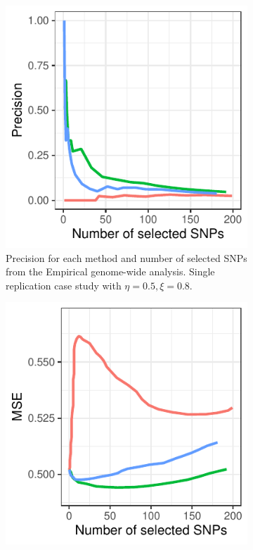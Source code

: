 \begin{figure}[H]
     \centering
     \begin{subfigure}[b]{0.4\textwidth}
         \centering
         \includegraphics[width=\textwidth]{figures/figure_05a.pdf}
         \caption{Precision for each method and number of selected SNPs from the Empirical genome-wide analysis. Single replication case study with $\eta = 0.5, \xi = 0.8$.}
        \label{fig:gw_prc}
     \end{subfigure}
    \hfill
     \begin{subfigure}[b]{0.4\textwidth}
         \centering
         \includegraphics[width=\textwidth]{figures/figure_05b.pdf}

\end{subfigure}
\end{figure}
